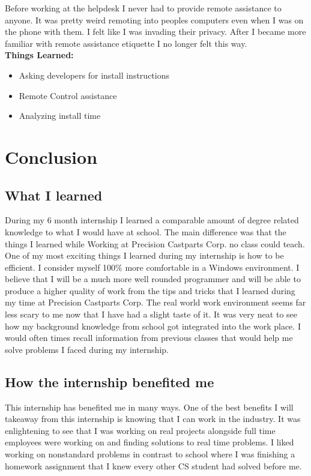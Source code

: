 \documentclass[letterpaper,10pt,notitlepage,fleqn]{article}
\begin{document}
\indent Before working at the helpdesk I never had to provide remote assistance 
to anyone. It was pretty weird remoting into peoples computers even when 
I was on the phone with them. I felt like I was invading their privacy. After I became 
more familiar with remote assistance etiquette I no longer felt this way.\\ 

\textbf{Things Learned:}
\begin{itemize} 
        \item Asking developers for install instructions
        \item Remote Control assistance
        \item Analyzing install time
    \end{itemize}

\section{Conclusion}
\subsection{What I learned}
\indent During my 6 month internship I learned a comparable amount of degree related knowledge
to what I would have at school. The main difference was that the things I learned while 
Working at Precision Castparts Corp. no class could teach. One of my most exciting things 
I learned during my internship is how to be efficient. I consider myself 100\% more 
comfortable in a Windows environment. I believe that I will be a much more well rounded programmer 
and will be able to produce a higher quality of work from the tips and tricks 
that I learned during my time at Precision Castparts Corp. The real world work environment seems 
far less scary to me now that I have had a slight taste of it. It was very neat 
to see how my background knowledge from school got integrated into the work place.
I would often times recall information from previous classes that would help me 
solve problems I faced during my internship. 
\\
\subsection{How the internship benefited me}
\indent This internship has benefited me in many ways. One of the best 
benefits I will takeaway from this internship is knowing that I can work in the 
industry. It was enlightening to see that I was working on real projects alongside full time 
employees were working on and finding solutions to real time problems. I liked working on 
nonstandard problems in contrast to school where I was finishing 
a homework assignment that I knew every other CS student had solved before me.  
\\
\end{document}
